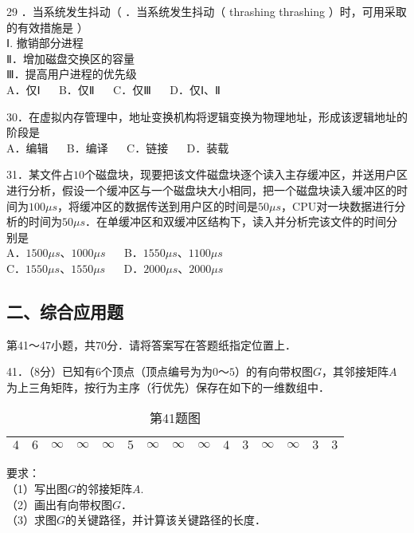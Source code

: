 29 ．当系统发生抖动（ ．当系统发生抖动（ thrashing thrashing ）时，可用采取的有效措施是 ） \\
Ⅰ. 撤销部分进程 \\
Ⅱ．增加磁盘交换区的容量 \\
Ⅲ．提高用户进程的优先级 \\
A．仅Ⅰ $\quad$ B．仅Ⅱ $\quad$ C．仅Ⅲ $\quad$ D．仅Ⅰ、Ⅱ

30．在虚拟内存管理中，地址变换机构将逻辑变换为物理地址，形成该逻辑地址的阶段是 \\
A．编辑 $\quad$ B．编译 $\quad$ C．链接 $\quad$ D．装载

31．某文件占$10$个磁盘块，现要把该文件磁盘块逐个读入主存缓冲区，并送用户区进行分析，假设一个缓冲区与一个磁盘块大小相同，把一个磁盘块读入缓冲区的时间为$100\mu s$，将缓冲区的数据传送到用户区的时间是$50\mu s$，CPU对一块数据进行分析的时间为$50\mu s$．在单缓冲区和双缓冲区结构下，读入并分析完该文件的时间分别是 \\
A．$1500\mu s$、$1000\mu s$ $\quad$ B．$1550\mu s$、$1100\mu s$ \\
C．$1550\mu s$、$1550\mu s$ $\quad$ D．$2000\mu s$、$2000\mu s$












\subsection{二、综合应用题}
第41～47小题，共70分．请将答案写在答题纸指定位置上．

41．（8分）已知有$6$个顶点（顶点编号为为$0$～$5$）的有向带权图$G$，其邻接矩阵$A$为上三角矩阵，按行为主序（行优先）保存在如下的一维数组中．
\begin{table}[ht]
\centering
\caption{第41题图}\label{Na11_tab1}
\begin{tabular}{|c|c|c|c|c|c|c|c|c|c|c|c|c|c|c|}
\hline
$4$ & $6$ & $\infty$ & $\infty$ & $\infty$ & $5$ & $\infty$ & $\infty$ & $\infty$ & $4$ & $3$ & $\infty$ & $\infty$ & $3$ & $3$ \\
\hline
\end{tabular}
\end{table}
要求：  \\
（1）写出图$G$的邻接矩阵$A$.  \\
（2）画出有向带权图$G$．  \\
（3）求图$G$的关键路径，并计算该关键路径的长度．




